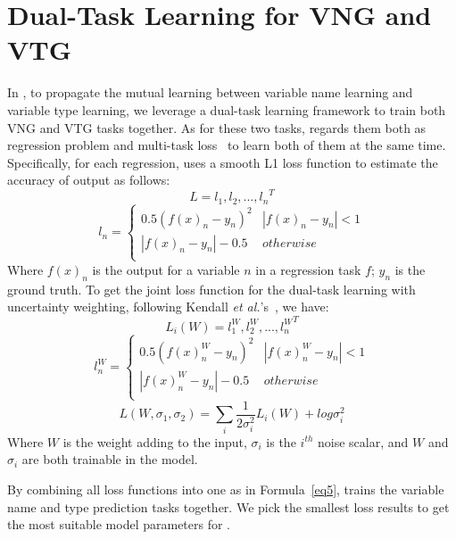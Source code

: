 \section{Dual-Task Learning for VNG and VTG}
\label{sec:dual}

In {\tool}, to propagate the mutual learning between
variable name learning and variable type learning,
we leverage a dual-task learning framework to
train both VNG and VTG tasks together.
As for these two tasks, {\tool} regards them both as regression
problem and multi-task loss~\cite{kendall2018multi} to learn both of
them at the same time. Specifically, for each regression, \tool uses a
smooth L1 loss function to estimate the accuracy of output as follows:
\begin{equation}\label{eq1}
L = {l_1, l_2, ..., l_n}^T
\end{equation}
\begin{equation}\label{eq2}
l_n = \left\{ 
	\begin{array}{lr}
    	0.5(f(x)_n-y_n)^2  & |f(x)_n-y_n|<1 \\
   	    |f(x)_n-y_n|-0.5   & otherwise   \\
	\end{array}
\right.
\end{equation}
Where $f(x)_n$ is the output for a variable $n$ in a regression task
$f$; $y_n$ is the ground truth. To get the joint loss function for the
dual-task learning with uncertainty weighting, following Kendall {\em
  et al.}'s~\cite{kendall2018multi}, we have:
\begin{equation}\label{eq3}
L_i(W) = {l_1^W, l_2^W, ..., l_n^W}^T
\end{equation}
\begin{equation}\label{eq4}
l_n^W = \left\{ 
	\begin{array}{lr}
		0.5(f(x)^W_n-y_n)^2  & |f(x)^W_n-y_n|<1 \\
		|f(x)^W_n-y_n|-0.5   & otherwise   \\
	\end{array}
\right.
\end{equation}
\begin{equation}\label{eq5}
L(W, \sigma_1, \sigma_2) = \sum_i\frac{1}{2\sigma_i^2}L_i(W) + log \sigma^2_i
\end{equation}
Where $W$ is the weight adding to the input, $\sigma_i$ is the $i^{th}$ noise scalar, and $W$ and $\sigma_i$ are both trainable in the model.

By combining all loss functions into one as in Formula~\ref{eq5}, {\tool} trains the variable name and type prediction tasks together. We pick the smallest loss results to get the most suitable model parameters for {\tool}.
